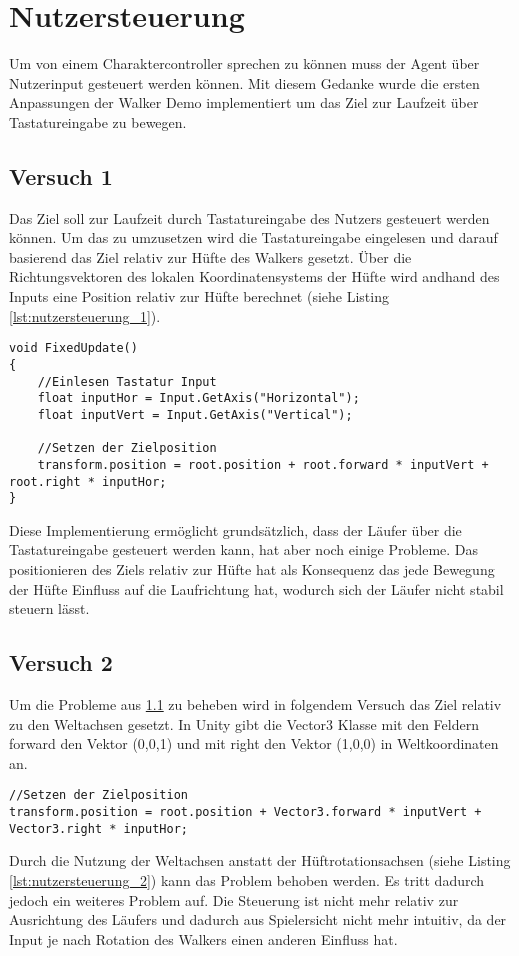 \section{Nutzersteuerung}
Um von einem Charaktercontroller sprechen zu können muss der Agent über Nutzerinput gesteuert werden können. Mit diesem Gedanke wurde die ersten Anpassungen der Walker Demo implementiert um das Ziel zur Laufzeit über Tastatureingabe zu bewegen.

\subsection{Versuch 1}
\label{subsec:versuch_1}
Das Ziel soll zur Laufzeit durch Tastatureingabe des Nutzers gesteuert werden können.
Um das zu umzusetzen wird die Tastatureingabe eingelesen und darauf basierend das Ziel relativ zur Hüfte des Walkers gesetzt. Über die Richtungsvektoren des lokalen Koordinatensystems der Hüfte wird andhand des Inputs eine Position relativ zur Hüfte berechnet (siehe Listing \ref{lst:nutzersteuerung_1}).
\begin{lstlisting}[caption={Nutzersteuerung erster Prototyp},captionpos=b,label={lst:nutzersteuerung_1}]
void FixedUpdate()
{
    //Einlesen Tastatur Input
    float inputHor = Input.GetAxis("Horizontal");
    float inputVert = Input.GetAxis("Vertical");
        
    //Setzen der Zielposition
    transform.position = root.position + root.forward * inputVert + root.right * inputHor;
}
\end{lstlisting}
Diese Implementierung ermöglicht grundsätzlich, dass der Läufer über die Tastatureingabe gesteuert werden kann, hat aber noch einige Probleme. Das positionieren des Ziels relativ zur Hüfte hat als Konsequenz das jede Bewegung der Hüfte Einfluss auf die Laufrichtung hat, wodurch sich der Läufer nicht stabil steuern lässt. 

\subsection{Versuch 2}
Um die Probleme aus \ref{subsec:versuch_1} zu beheben wird in folgendem Versuch das Ziel relativ zu den Weltachsen gesetzt. In Unity gibt die Vector3 Klasse mit den Feldern forward den Vektor (0,0,1) und mit right den Vektor (1,0,0) in Weltkoordinaten an.
\begin{lstlisting}[caption={Nutzersteuerung berechnung mit Weltachsen},captionpos=b,label={lst:nutzersteuerung_2}]
//Setzen der Zielposition
transform.position = root.position + Vector3.forward * inputVert + Vector3.right * inputHor;
\end{lstlisting}
Durch die Nutzung der Weltachsen anstatt der Hüftrotationsachsen (siehe Listing \ref{lst:nutzersteuerung_2}) kann das Problem behoben werden. Es tritt dadurch jedoch ein weiteres Problem auf. Die Steuerung ist nicht mehr relativ zur Ausrichtung des Läufers und dadurch aus Spielersicht nicht mehr intuitiv, da der Input je nach Rotation des Walkers einen anderen Einfluss hat.

